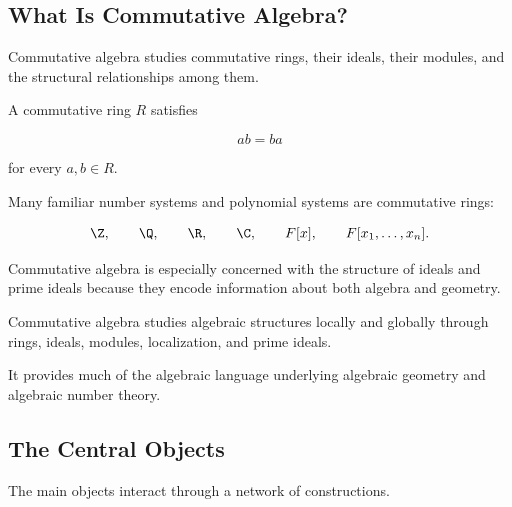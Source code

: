 \subsection{What Is Commutative Algebra?}
\label{subsec:what-is-commutative-algebra}

Commutative algebra studies commutative rings, their ideals, their modules,
and the structural relationships among them.

A commutative ring \(R\) satisfies

\[ ab=ba \]

for every \(a,b\in R\).

Many familiar number systems and polynomial systems are commutative rings:

\[ \Z,\qquad \Q,\qquad \R,\qquad \C,\qquad F[x],\qquad F[x_1,\ldots,x_n]. \]

Commutative algebra is especially concerned with the structure of ideals and
prime ideals because they encode information about both algebra and geometry.

\begin{conceptbox}
Commutative algebra studies algebraic structures locally and globally through
rings, ideals, modules, localization, and prime ideals.

It provides much of the algebraic language underlying algebraic geometry and
algebraic number theory.
\end{conceptbox}

\subsection{The Central Objects}
\label{subsec:commutative-algebra-central-objects}

The main objects interact through a network of constructions.

\begin{center}
\end{center}


